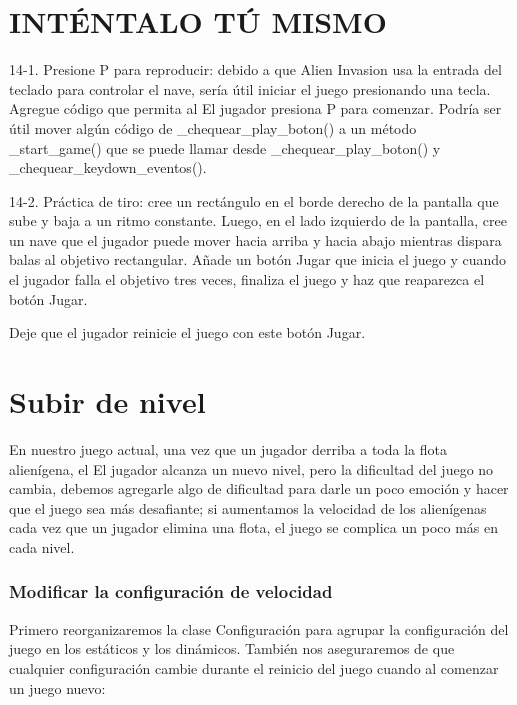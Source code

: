 \section{INTÉNTALO TÚ MISMO}


14-1. Presione P para reproducir: debido a que Alien Invasion usa la entrada del teclado para controlar el
nave, sería útil iniciar el juego presionando una tecla. Agregue código que permita al
El jugador presiona P para comenzar. Podría ser útil mover algún código de {\ttfamily \_chequear\_play\_boton()}
a un método {\ttfamily  \_start\_game()} que se puede llamar desde {\ttfamily  \_chequear\_play\_boton()} y
{\ttfamily \_chequear\_keydown\_eventos()}.



14-2. Práctica de tiro: cree un rectángulo en el borde derecho de la pantalla que
sube y baja a un ritmo constante. Luego, en el lado izquierdo de la pantalla, cree
un nave que el jugador puede mover hacia arriba y hacia abajo mientras dispara balas al
objetivo rectangular. Añade un botón Jugar que inicia el juego y cuando el jugador
falla el objetivo tres veces, finaliza el juego y haz que reaparezca el botón Jugar.

Deje que el jugador reinicie el juego con este botón Jugar.


\section{Subir de nivel}



En nuestro juego actual, una vez que un jugador derriba a toda la flota alienígena, el
El jugador alcanza un nuevo nivel, pero la dificultad del juego no cambia, debemos agregarle algo de dificultad para darle  
un poco emoción y hacer que el juego sea más desafiante; si aumentamos la velocidad de los alienígenas cada vez que un jugador elimina una flota, el juego se complica un poco  más en cada nivel.


\subsubsection{Modificar la configuración de velocidad}


Primero reorganizaremos la clase Configuración para agrupar la configuración del juego en
los estáticos y los dinámicos. También nos aseguraremos de que cualquier configuración cambie
durante el reinicio del juego cuando al comenzar un juego nuevo:




